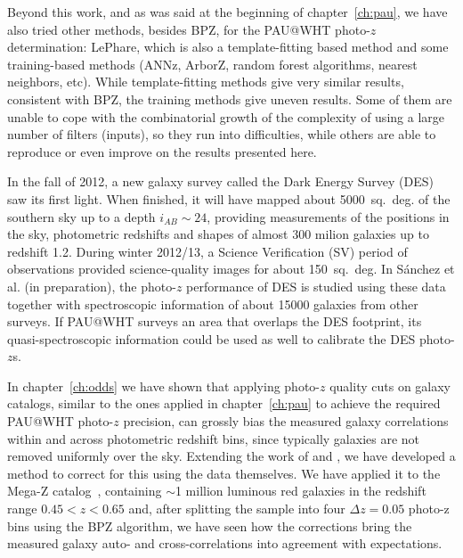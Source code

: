 Beyond this work, and as was said at the beginning of chapter~\ref{ch:pau}, we have also tried other methods, besides BPZ, for the PAU@WHT photo-$z$ determination: LePhare, which is also a template-fitting based method and some training-based methods (ANNz, ArborZ, random forest algorithms, nearest neighbors, etc). While template-fitting methods give very similar results, consistent with BPZ, the training methods give uneven results. Some of them are unable to cope with the combinatorial growth of the complexity of using a large number of filters (inputs), so they run into difficulties, while others are able to reproduce or even improve on the results presented here. 

In the fall of 2012, a new galaxy survey called the Dark Energy Survey (DES) saw its first light. When finished, it will have mapped about 5000~sq.~deg. of the southern sky up to a depth $i_{AB} \sim 24$, providing measurements of the positions in the sky, photometric redshifts and shapes of almost 300 milion galaxies up to redshift 1.2. During winter 2012/13, a Science Verification (SV) period of observations provided science-quality images for about 150~sq.~deg. In S\'anchez et al. (in preparation), the photo-$z$ performance of DES is studied using these data together with spectroscopic information of about 15000 galaxies from other surveys. If PAU@WHT surveys an area that overlaps the DES footprint, its quasi-spectroscopic information could be used as well to calibrate the DES photo-$z$s. 

In chapter~\ref{ch:odds} we have shown that applying photo-$z$ quality cuts on galaxy catalogs, similar to the ones applied in chapter~\ref{ch:pau} to achieve the required PAU@WHT photo-$z$ precision, can grossly bias the measured galaxy correlations within and across photometric redshift bins, since typically galaxies are not removed uniformly over the sky. Extending the work of \citet{Ho2012} and \citet{Ross2011}, we have developed a method to correct for this using the data themselves. We have applied it to the Mega-Z catalog~\citep{Collister2007}, containing $\sim$1 million luminous red galaxies in the redshift range $0.45<z<0.65$ and, after splitting the sample into four $\Delta z = 0.05$ photo-z bins using the BPZ algorithm, we have seen how the corrections bring the measured galaxy auto- and cross-correlations into agreement with expectations. 

